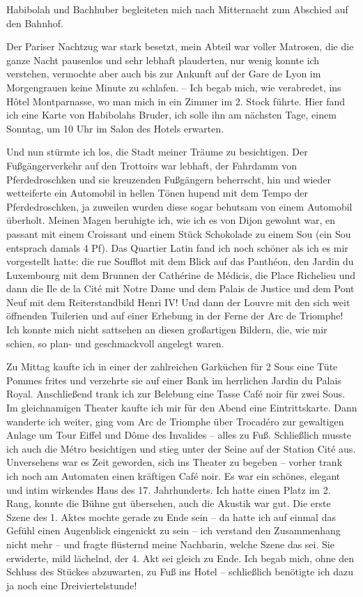 \documentclass[a5paper,pagesize,10pt,twoside=true]{scrbook}
\renewcommand{\marginpar}[2][]{}
\begin{document}
Habibolah und Bachhuber begleiteten mich nach Mitternacht zum Abschied auf den Bahnhof.

Der Pariser Nachtzug war stark besetzt, mein Abteil war voller Matrosen, die die ganze Nacht pausenlos und sehr lebhaft plauderten, nur wenig konnte ich verstehen, vermochte aber auch bis zur Ankunft auf der Gare de Lyon im Morgengrauen keine Minute zu schlafen. -- Ich begab mich, wie verabredet, ins Hôtel Montparnasse, wo man mich in ein Zimmer im 2. Stock führte. Hier fand ich eine Karte von Habibolahs Bruder, ich solle ihn am nächsten Tage, einem Sonntag, um 10 Uhr im Salon des Hotels erwarten.

Und nun stürmte ich los, die Stadt meiner Träume zu besichtigen. Der Fußgängerverkehr auf den Trottoirs war lebhaft, der Fahrdamm von Pferdedroschken und sie kreuzenden Fußgängern beherrscht, hin und wieder wetteiferte ein Automobil in hellen Tönen hupend mit dem Tempo der Pferdedroschken, ja zuweilen wurden diese sogar behutsam von einem Automobil überholt. Meinen Magen beruhigte ich, wie ich es von Dijon gewohnt war, en passant mit einem Croissant und einem Stück Schokolade zu einem Sou (ein Sou entsprach damals 4 Pf). Das Quartier Latin fand ich noch schöner als ich es mir vorgestellt hatte: die rue Soufflot mit dem Blick auf das Panthéon, den Jardin du Luxembourg mit dem Brunnen der Cathérine de Médicis, die Place Richelieu und dann die Ile de la Cité mit Notre Dame und dem Palais de Justice und dem Pont Neuf mit dem Reiterstandbild Henri IV! Und dann der Louvre mit den sich weit öffnenden Tuilerien und auf einer Erhebung in der Ferne der Arc de Triomphe! Ich konnte mich nicht sattsehen an diesen großartigen Bildern, die, wie mir schien, so plan- und geschmackvoll angelegt waren.

Zu Mittag kaufte ich in einer der zahlreichen Garküchen für 2 Sous eine Tüte Pommes frites und verzehrte sie auf einer Bank im herrlichen Jardin du Palais Royal. Anschließend trank ich zur Belebung eine Tasse Café noir für zwei Sous. Im gleichnamigen Theater kaufte ich mir für den Abend eine Eintrittskarte. Dann wanderte ich weiter, ging vom Arc de Triomphe über Trocadéro zur gewaltigen Anlage um Tour Eiffel und Dôme des \marginpar{132} Invalides -- alles zu Fuß. Schließlich musste ich auch die Métro besichtigen und stieg unter der Seine auf der Station Cité aus. Unversehens war es Zeit geworden, sich ins Theater zu begeben -- vorher trank ich noch am Automaten einen kräftigen Café noir. Es war ein schönes, elegant und intim wirkendes Haus des 17. Jahrhunderts. Ich hatte einen Platz im 2. Rang, konnte die Bühne gut übersehen, auch die Akustik war gut. Die erste Szene des 1. Aktes mochte gerade zu Ende sein -- da hatte ich auf einmal das Gefühl einen Augenblick eingenickt zu sein -- ich verstand den Zusammenhang nicht mehr -- und fragte flüsternd meine Nachbarin, welche Szene das sei. Sie erwiderte, mild lächelnd, der 4. Akt sei gleich zu Ende. Ich begab mich, ohne den Schluss des Stückes abzuwarten, zu Fuß ins Hotel -- schließlich benötigte ich dazu ja noch eine Dreiviertelstunde!
\end{document}
